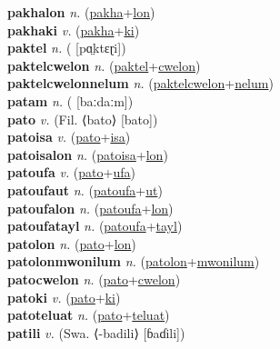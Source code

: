 \textbf{pakhalon} \textit{n.} (\hyperref[pakha]{pakha}+\hyperref[lon]{lon})
 \label{pakhalon} \\
\textbf{pakhaki} \textit{v.} (\hyperref[pakha]{pakha}+\hyperref[ki]{ki})
 \label{pakhaki} \\
\textbf{paktel} \textit{n.} ( [pɑ̤ktɛɽi])
 \label{paktel} \\
\textbf{paktelcwelon} \textit{n.} (\hyperref[paktel]{paktel}+\hyperref[cwelon]{cwelon})
 \label{paktelcwelon} \\
\textbf{paktelcwelonnelum} \textit{n.} (\hyperref[paktelcwelon]{paktelcwelon}+\hyperref[nelum]{nelum})
 \label{paktelcwelonnelum} \\
\textbf{patam} \textit{n.} ( [baːdaːm])
 \label{patam} \\
\textbf{pato} \textit{v.} (Fil. ⟨bato⟩ [bato])
 \label{pato} \\
\textbf{patoisa} \textit{v.} (\hyperref[pato]{pato}+\hyperref[isa]{isa})
 \label{patoisa} \\
\textbf{patoisalon} \textit{n.} (\hyperref[patoisa]{patoisa}+\hyperref[lon]{lon})
 \label{patoisalon} \\
\textbf{patoufa} \textit{v.} (\hyperref[pato]{pato}+\hyperref[ufa]{ufa})
 \label{patoufa} \\
\textbf{patoufaut} \textit{n.} (\hyperref[patoufa]{patoufa}+\hyperref[ut]{ut})
 \label{patoufaut} \\
\textbf{patoufalon} \textit{n.} (\hyperref[patoufa]{patoufa}+\hyperref[lon]{lon})
 \label{patoufalon} \\
\textbf{patoufatayl} \textit{n.} (\hyperref[patoufa]{patoufa}+\hyperref[tayl]{tayl})
 \label{patoufatayl} \\
\textbf{patolon} \textit{n.} (\hyperref[pato]{pato}+\hyperref[lon]{lon})
 \label{patolon} \\
\textbf{patolonmwonilum} \textit{n.} (\hyperref[patolon]{patolon}+\hyperref[mwonilum]{mwonilum})
 \label{patolonmwonilum} \\
\textbf{patocwelon} \textit{n.} (\hyperref[pato]{pato}+\hyperref[cwelon]{cwelon})
 \label{patocwelon} \\
\textbf{patoki} \textit{v.} (\hyperref[pato]{pato}+\hyperref[ki]{ki})
 \label{patoki} \\
\textbf{patoteluat} \textit{n.} (\hyperref[pato]{pato}+\hyperref[teluat]{teluat})
 \label{patoteluat} \\
\textbf{patili} \textit{v.} (Swa. ⟨-badili⟩ [ɓaɗili])
 \label{patili} \\
